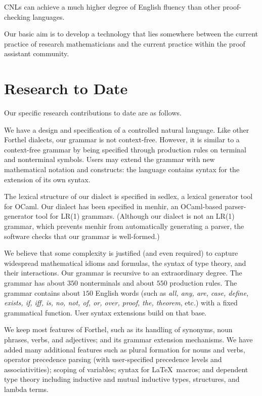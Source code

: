 \documentclass{easychair}
\renewcommand{\~}{\ }
\renewcommand{\_}{\textunderscore}
\begin{document}
CNLs can achieve a much higher degree of English fluency than other
proof-checking languages.  


Our
basic aim is to develop a technology that lies somewhere
between the current practice of research mathematicians and the current
practice within the proof assistant community.  

\section{Research to Date}

Our specific research contributions to date are as follows.

We have a design and specification of a controlled natural
language.
Like other Forthel dialects, our grammar is not context-free.
However, it is similar to a context-free grammar by being specified through
production rules on terminal and nonterminal symbols.
Users may extend the grammar with new mathematical notation
and constructs:  the language
contains syntax for the extension of its own syntax. 

The lexical structure of our dialect is specified in sedlex, a lexical
generator tool for OCaml.
Our dialect has been specified in menhir, an OCaml-based
parser-generator tool for LR(1) grammars.  (Although our dialect is
not an LR(1) grammar, which prevents menhir from automatically
generating a parser, the software checks that our grammar is well-formed.)

We believe that some complexity is justified (and even required) to
capture widespread mathematical idioms and formulas, the syntax of type
theory, and their
interactions. Our grammar is recursive to an extraordinary degree.
The grammar has about $350$ nonterminals and about $550$ production
rules.  The grammar contains about $150$ English words 
(such as \emph{all, any, are, case, define, exists, if, iff, is, no, not, of, or, over, proof, the, theorem}, etc.) 
with a fixed grammatical
function.     User syntax
extensions build on that base.

We keep most features of Forthel, such as its handling of synonyms, noun
phrases, verbs, and adjectives; and its grammar extension mechanisms.
We have added many additional features such as plural formation for nouns and verbs,
operator precedence parsing (with
user-specified precedence levels and associativities); scoping of variables;
syntax for \LaTeX\ macros; and dependent type theory including
inductive and mutual inductive types, structures, and lambda
terms.
\end{document}
